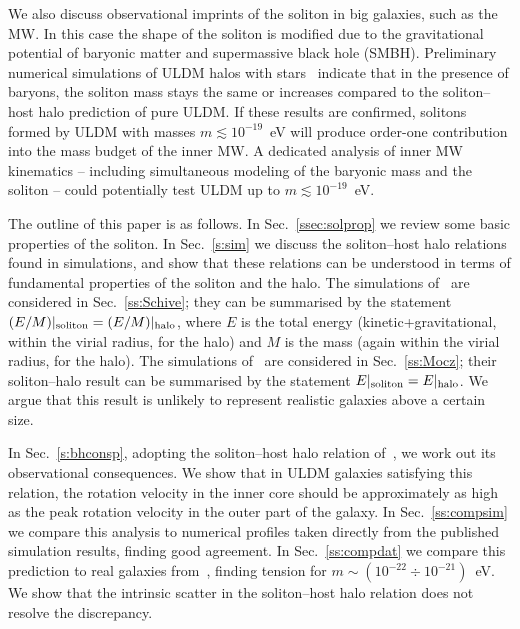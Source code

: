 \documentclass[aps,prd,floats,superscriptaddress,showpacs,nofootinbib,twocolumn,preprintnumbers]{revtex4-1}%
\begin{document}
We also discuss observational imprints of the soliton in big
galaxies, such as the MW. In this case the shape of the
soliton is modified due to the gravitational potential 
of baryonic matter and supermassive black
hole (SMBH). Preliminary
numerical simulations of ULDM halos with
stars~\cite{2017arXiv171201947C} 
indicate that
in the presence of baryons, the soliton mass stays the same or
increases compared to the soliton--host halo prediction of pure ULDM. If these results
are confirmed, solitons formed by ULDM with masses $m\lesssim
10^{-19}$~eV will produce order-one contribution into the mass
budget of the inner MW. A dedicated analysis
of inner MW kinematics -- including simultaneous
modeling of the baryonic mass and the soliton -- could potentially
test ULDM up to $m\lesssim10^{-19}$~eV. 

The outline of this paper is as follows. In Sec.~\ref{ssec:solprop} we
review some basic properties of the soliton.  
In Sec.~\ref{s:sim} we discuss the soliton--host halo relations found
in simulations, and show that these relations can be understood in
terms of fundamental properties of the soliton and the halo. The
simulations of~\cite{Schive:2014dra,Schive:2014hza} are considered in
Sec.~\ref{ss:Schive}; they can be summarised by the statement
$(E/M)|_{\rm soliton}=(E/M)|_{\rm halo}$, where $E$ is the total
energy (kinetic+gravitational, within the virial radius, for the halo)
and $M$ is the mass (again within the virial radius, for the
halo). The simulations of~\cite{Mocz:2017wlg} are considered in
Sec.~\ref{ss:Mocz}; their soliton--halo result can be summarised by
the statement $E|_{\rm soliton}=E|_{\rm halo}$. We argue that this
result is unlikely to represent realistic galaxies above a certain
size.  

In Sec.~\ref{s:bhconsp}, adopting the soliton--host halo relation
of~\cite{Schive:2014dra,Schive:2014hza}, we work out its
observational consequences. We show that in ULDM galaxies satisfying
this relation, the rotation velocity in the inner core should be
approximately as high as the peak rotation velocity in the outer part
of the galaxy. In Sec.~\ref{ss:compsim} we compare this analysis to
numerical profiles taken directly from the published simulation
results, finding good agreement. In Sec.~\ref{ss:compdat} we compare
this prediction to real galaxies from~\cite{deBlok:2002vgq,Lelli:2016zqa},
finding tension  
for $m\sim (10^{-22}\div 10^{-21})$~eV. We show that the intrinsic
scatter in the soliton--host halo relation does not resolve the
discrepancy. 
\end{document}
